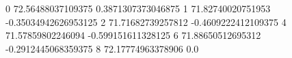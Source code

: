 0 72.56488037109375 0.3871307373046875
1 71.82740020751953 -0.35034942626953125
2 71.71682739257812 -0.4609222412109375
4 71.57859802246094 -0.599151611328125
6 71.88650512695312 -0.2912445068359375
8 72.17774963378906 0.0

